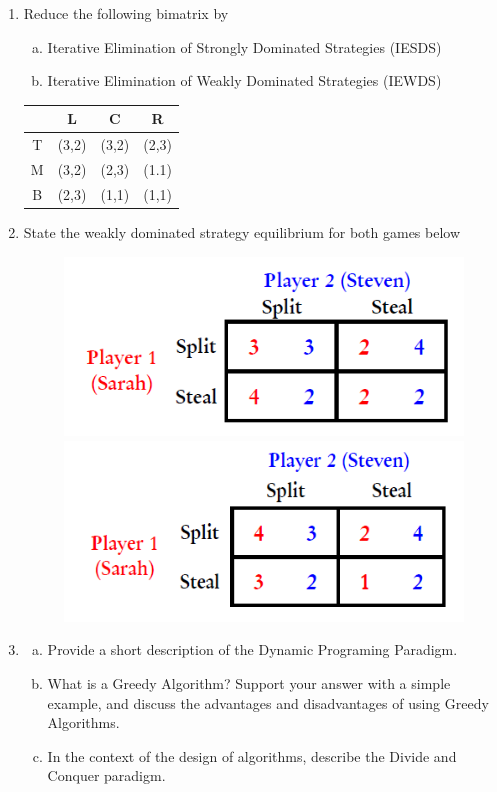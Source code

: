 \documentclass[]{report}
\begin{document}
\begin{enumerate}
\item 
Reduce the following bimatrix by
\begin{enumerate}[(a)]
	\item Iterative Elimination of Strongly Dominated Strategies (IESDS)
	\item Iterative Elimination of Weakly Dominated Strategies (IEWDS)
\end{enumerate}
\begin{center}
	\begin{tabular}{|c|c|c|c|} \hline 
		&    L  &  C  & R \\ \hline 
		T  &   (3,2) &  (3,2) &  (2,3) \\ \hline
     	M  &    (3,2)  &   (2,3)  &  (1.1) \\ \hline
		B  &    (2,3)  &    (1,1)  &   (1,1) \\ \hline
	\end{tabular}
\end{center}
\item State the weakly dominated strategy equilibrium for both games below
\begin{figure}[h!]
\centering
\includegraphics[width=0.45\linewidth]{Question20}
\includegraphics[width=0.45\linewidth]{Question20-b}
\end{figure}
	
\newpage	
 \item
 \begin{enumerate}[(a)]
 	
 	
 	\item Provide a short description of the Dynamic Programing Paradigm.  
 	\item What is a Greedy Algorithm? Support your answer with a simple example, and discuss the advantages and disadvantages of using Greedy Algorithms.   														
 	\item In the context of the design of algorithms, describe the Divide and Conquer paradigm.
 \end{enumerate}
 

\end{enumerate}
\end{document}

